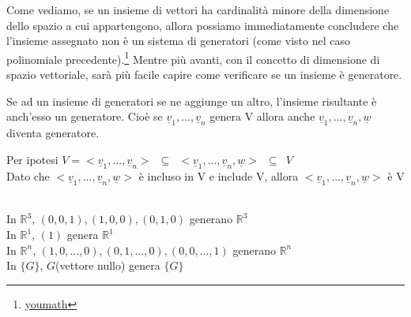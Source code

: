   Come vediamo, se un insieme di vettori ha cardinalità minore della
  dimensione dello spazio a cui appartengono, allora possiamo
  immediatamente concludere che l'insieme assegnato non è un sistema
  di generatori (come visto nel caso polinomiale
  precedente).\footnote{\href{https://www.youmath.it/lezioni/algebra-lineare/matrici-e-vettori/678-sistema-di-generatori-di-uno-spazio-vettoriale.html}{youmath}}
  Mentre più avanti, con il concetto di dimensione di spazio
  vettoriale, sarà più facile capire come verificare se un insieme è generatore.

  \begin{nota}
    Se ad un insieme di generatori se ne aggiunge un altro, l'insieme
    risultante è anch'esso un generatore. Cioè se
    $\underline{v}_1,...,\underline{v}_n$ genera V allora anche
    $\underline{v}_1,...,\underline{v}_n,\underline{w}$ diventa generatore.
    \begin{dimostrazione}
      Per ipotesi
      $V=<\underline{v}_1,...,\underline{v}_n>\phantom{1}\subseteq\phantom{1}<\underline{v}_1,...,\underline{v}_n,\underline{w}>\phantom{1}\subseteq\phantom{1}
      V$\\
      Dato che $<\underline{v}_1,...,\underline{v}_n,\underline{w}>$
      è incluso in V e include V, allora
      $<\underline{v}_1,...,\underline{v}_n,\underline{w}>$ è V\\
      \begin{es}
        \phantom{}\\
        In $\mathbb{R}^3$, $(0,0,1),(1,0,0),(0,1,0)$ generano $\mathbb{R}^3$\\
        In $\mathbb{R}^1$, $(1)$ genera $\mathbb{R}^1$\\
        In $\mathbb{R}^n$, $(1,0,...,0),(0,1,...,0),(0,0,...,1)$
        generano $\mathbb{R}^n$\\
        In $\{G\}$, $G$(vettore nullo) genera $\{G\}$
      \end{es}
    \end{dimostrazione}
  \end{nota}

